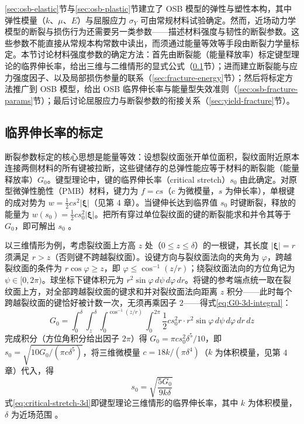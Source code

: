 \ref{sec:osb-elastic}节与\ref{sec:osb-plastic}节建立了 OSB 模型的弹性与塑性本构，其中弹性模量（$k$、$\mu$、$E$）与屈服应力 $\sigma_{Y}$ 可由常规材料试验确定。然而，近场动力学模型的断裂与损伤行为还需要另一类参数——描述材料强度与韧性的断裂参数。这些参数不能直接从常规本构常数中读出，而须通过能量等效等手段由断裂力学量标定。本节讨论材料强度参数的确定方法：首先由断裂能（能量释放率）标定键型理论的临界伸长率，给出三维与二维情形的显式公式（\ref{sec:critical-stretch}节）；进而建立断裂能与应力强度因子、以及局部损伤参量的联系（\ref{sec:fracture-energy}节）；然后将标定方法推广到 OSB 模型，给出 OSB 临界伸长率与能量型失效准则（\ref{sec:osb-fracture-params}节）；最后讨论屈服应力与断裂参数的衔接关系（\ref{sec:yield-fracture}节）。

\subsection{临界伸长率的标定}\label{sec:critical-stretch}

断裂参数标定的核心思想是能量等效：设想裂纹面张开单位面积，裂纹面附近原本连接两侧材料的所有键被拉断，这些键储存的总弹性能应等于材料的断裂能（能量释放率）$G_{0}$。键型理论中，键的临界伸长率（critical stretch）$s_{0}$ 由此确定。对原型微弹性脆性（PMB）材料，键力为 $f=cs$（$c$ 为微模量，$s$ 为伸长率），单根键的成对势为 $w=\tfrac{1}{2}cs^{2}|\boldsymbol{\xi}|$（见第 4 章）。当键伸长达到临界值 $s_{0}$ 时键断裂，释放的能量为 $w(s_{0})=\tfrac{1}{2}cs_{0}^{2}|\boldsymbol{\xi}|$。把所有穿过单位裂纹面的键的断裂能求和并令其等于 $G_{0}$，即可解出 $s_{0}$ \cite{SillingAskari2005}。

以三维情形为例，考虑裂纹面上方高 $z$ 处（$0\le z\le\delta$）的一根键，其长度 $|\boldsymbol{\xi}|=r$ 须满足 $r>z$（否则键不跨越裂纹面）。设键方向与裂纹面法向的夹角为 $\varphi$，跨越裂纹面的条件为 $r\cos\varphi\ge z$，即 $\varphi\le\cos^{-1}(z/r)$；绕裂纹面法向的方位角记为 $\psi\in[0,2\pi)$。球坐标下键体积元为 $r^{2}\sin\varphi\,d\psi\,d\varphi\,dr$。将键的参考端点统一取在裂纹面上方，对全部跨越裂纹面的键求和并对裂纹面法向距离 $z$ 积分——此时每个跨越裂纹面的键恰好被计数一次，无须再乘因子 $2$——得式\eqref{eq:G0-3d-integral}：
\begin{equation}
  G_{0}=\int_{0}^{\delta}\int_{z}^{\delta}\int_{0}^{\cos^{-1}(z/r)}
  \int_{0}^{2\pi}
  \frac{1}{2}cs_{0}^{2}r\cdot r^{2}\sin\varphi\,d\psi\,d\varphi\,dr\,dz
  \label{eq:G0-3d-integral}
\end{equation}
完成积分（方位角积分给出因子 $2\pi$）得 $G_{0}=\pi c s_{0}^{2}\delta^{5}/10$，即 $s_{0}=\sqrt{10G_{0}/(\pi c\delta^{5})}$，将三维微模量 $c=18k/(\pi\delta^{4})$（$k$ 为体积模量，见第 4 章）代入，得
\begin{equation}
  s_{0}=\sqrt{\frac{5G_{0}}{9k\delta}}
  \label{eq:critical-stretch-3d}
\end{equation}
式\eqref{eq:critical-stretch-3d}即键型理论三维情形的临界伸长率，其中 $k$ 为体积模量，$\delta$ 为近场范围 \cite{SillingAskari2005,MadenciOterkus2014}。

